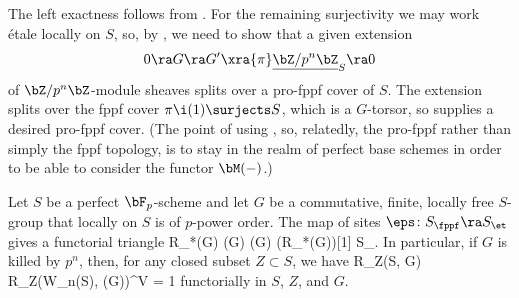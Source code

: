 \bpf
The left exactness follows from . For the remaining surjectivity we may work \'{e}tale locally on $S$, so, by , we need to show that a given extension
\[
0 \ra G \ra G' \xra{\pi} \underline{\bZ/p^n\bZ}_S \ra 0
\]
of $\bZ/p^n\bZ$-module sheaves splits over a pro-fppf cover of $S$. The extension splits over the fppf cover $\pi\i(1) \surjects S$, which is a $G$-torsor, %
so  supplies a desired pro-fppf cover. (The point of using , so, relatedly, the pro-fppf rather than simply the fppf topology, is to stay in the realm of perfect base schemes in order to be able to consider the functor $\bM(-)$.)
\epf



\bthm \label{KT-input}
Let $S$ be a perfect $\bF_p$-scheme and let $G$ be a commutative, finite, locally free $S$-group that locally on $S$ is of $p$-power order. The map  of sites $\eps \colon S_\fppf \ra S_{\et}$ gives a functorial triangle
\be \label{eqn:KT-triangle}
R\eps_*(G) \ra \bM(G)  \bM(G) \ra (R\eps_*(G))[1]  S_\et.
\ee
In particular, if $G$ is killed by $p^n$, then, %
for any closed subset $Z \subset S$, we have
\be \label{crystalline-cor}
R\Gamma_Z(S, G) \cong R\Gamma_Z(W_n(S), \bM(G))^{V = 1}  %
\ee
functorially in $S$, $Z$, and $G$.
\ethm






